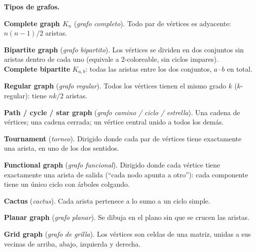 \textbf{Tipos de grafos.}
\begin{props}
  \item \textbf{Complete graph \(K_n\)} (\textit{grafo completo}). Todo par de vértices es adyacente: \(n(n-1)/2\) aristas.
  \item \textbf{Bipartite graph} (\textit{grafo bipartito}). Los vértices se dividen en dos conjuntos sin aristas dentro de cada uno (equivale a 2-coloreable, sin ciclos impares). \textbf{Complete bipartite} \(K_{a,b}\): todas las aristas entre los dos conjuntos, \(a \cdot b\) en total.
  \item \textbf{Regular graph} (\textit{grafo regular}). Todos los vértices tienen el mismo grado \(k\) (\(k\)-regular): tiene \(nk/2\) aristas.
  \item \textbf{Path / cycle / star graph} (\textit{grafo camino / ciclo / estrella}). Una cadena de vértices; una cadena cerrada; un vértice central unido a todos los demás.
  \item \textbf{Tournament} (\textit{torneo}). Dirigido donde cada par de vértices tiene exactamente una arista, en uno de los dos sentidos.
  \item \textbf{Functional graph} (\textit{grafo funcional}). Dirigido donde cada vértice tiene exactamente una arista de salida (``cada nodo apunta a otro''): cada componente tiene un único ciclo con árboles colgando.
  \item \textbf{Cactus} (\textit{cactus}). Cada arista pertenece a lo sumo a un ciclo simple.
  \item \textbf{Planar graph} (\textit{grafo planar}). Se dibuja en el plano sin que se crucen las aristas.
  \item \textbf{Grid graph} (\textit{grafo de grilla}). Los vértices son celdas de una matriz, unidas a sus vecinas de arriba, abajo, izquierda y derecha.
\end{props}

